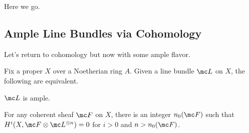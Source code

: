 \documentclass[../notes.tex]{subfiles}
\begin{document}
Here we go.

\subsection{Ample Line Bundles via Cohomology}
Let's return to cohomology but now with some ample flavor.
\begin{proposition}
	Fix a proper $X$ over a Noetherian ring $A$. Given a line bundle $\mc L$ on $X$, the following are equivalent.
	\begin{listroman}
		\item $\mc L$ is ample.
		\item For any coherent sheaf $\mc F$ on $X$, there is an integer $n_0(\mc F)$ such that $H^i(X,\mc F\otimes\mc L^{\otimes n})=0$ for $i>0$ and $n>n_0(\mc F)$.
	\end{listroman}
\end{proposition}
\end{document}
